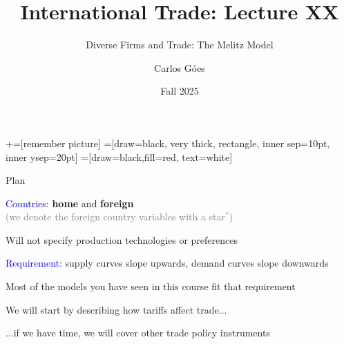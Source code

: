 \documentclass[notes,11pt, aspectratio=169, xcolor=table]{beamer}
\title[]{International Trade: Lecture XX}
\subtitle[]{Diverse Firms and Trade: The Melitz Model}
\author[Góes]
{Carlos Góes\inst{1}}
\date{Fall 2025}
\institute[GWU]{\inst{1} George Washington University }
\newcommand{\blue}[1]{\textcolor{blue}{#1}}
\newenvironment{wideitemize}{\itemize\addtolength{\itemsep}{10pt}}{\enditemize}
\begin{document}
\newcommand\marktopleft[1]{%
    \tikz[overlay,remember picture] 
        \node (marker-#1-a) at (-.3em,.3em) {};%
}
\newcommand\markbottomright[2]{%
    \tikz[overlay,remember picture] 
        \node (marker-#1-b) at (0em,0em) {};%
}
+=[remember picture] 
 =[draw=black, very thick, rectangle, inner sep=10pt, inner ysep=20pt]
 =[draw=black,fill=red, text=white]















\frame{\titlepage}
\addtocounter{framenumber}{-1}

\begin{frame}{Plan}
\begin{wideitemize}
    \item \blue{Countries}: \textbf{home} and \textbf{foreign} \\
    \qquad \textcolor{gray}{(we denote the foreign country variables with a star$^*$)}
    \item<2-> Will not specify production technologies or preferences
    \item<2-> \blue{Requirement}: supply curves slope upwards, demand curves slope downwards
    \item<3-> Most of the models you have seen in this course fit that requirement 
    \item<4-> We will start by describing how tariffs affect trade...
    \item<5-> ...if we have time, we will cover other trade policy instruments
\end{wideitemize}
    
\end{frame}
\end{document}
